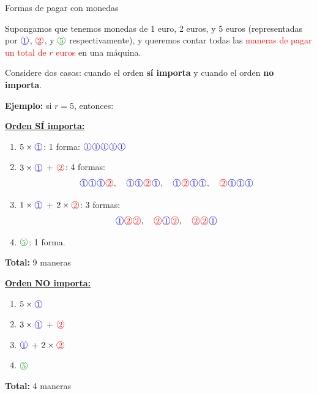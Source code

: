 \begin{exampleblock}{Formas de pagar con monedas}

Supongamos que tenemos monedas de 1 euro, 2 euros, y 5 euros (representadas por $\circledone$, $\circledtwo$, y $\circledfive$ respectivamente), y queremos contar todas las \textcolor{red}{maneras de pagar un total de $r$ euros} en una máquina.

Considere dos casos: cuando el orden \textbf{sí importa} y cuando el orden \textbf{no importa}.

\medskip
\textbf{Ejemplo:} si $r = 5$, entonces:

\begin{minipage}{0.6\textwidth}
\underline{\textbf{Orden SÍ importa:}}

\begin{enumerate}
  \item $5 \times \circledone$: 1 forma: \quad $\circledone\circledone\circledone\circledone\circledone$
  \item $3 \times \circledone$ + $\circledtwo$: 4 formas:
  \[
  \circledone\circledone\circledone\circledtwo,\quad
  \circledone\circledone\circledtwo\circledone,\quad
  \circledone\circledtwo\circledone\circledone,\quad
  \circledtwo\circledone\circledone\circledone
  \]
  \item $1 \times \circledone$ + $2 \times \circledtwo$: 3 formas:
  \[
  \circledone\circledtwo\circledtwo,\quad
  \circledtwo\circledone\circledtwo,\quad
  \circledtwo\circledtwo\circledone
  \]
  \item $\circledfive$: 1 forma.
\end{enumerate}

\textbf{Total:} 9 maneras
\end{minipage}%
\hfill
\begin{minipage}{0.35\textwidth}
\underline{\textbf{Orden NO importa:}}

\begin{enumerate}
  \item $5 \times \circledone$
  \item $3 \times \circledone$ + $\circledtwo$
  \item $\circledone$ + $2 \times \circledtwo$
  \item $\circledfive$
\end{enumerate}

\textbf{Total:} 4 maneras
\end{minipage}

\end{exampleblock}

